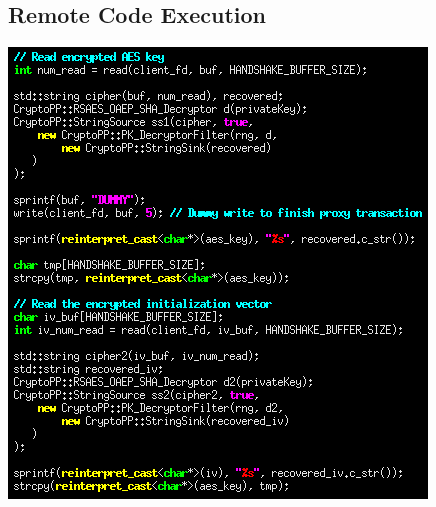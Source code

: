 \documentclass[12pt]{article}
\begin{document}
\subsection*{Remote Code Execution}
\includegraphics[width=\textwidth]{bankscreenshot_cropped.png}
\pagebreak\\
\begin{tikzpicture}

\end{tikzpicture}
\end{document}

